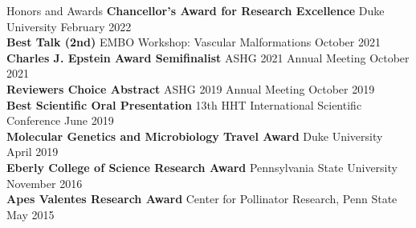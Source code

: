 \documentclass{resume} %
\begin{document}
\begin{rSection}{Honors and Awards}
{\bf Chancellor's Award for Research Excellence} Duke University \hfill {February 2022} \\ 
{\bf Best Talk (2nd)} EMBO Workshop: Vascular Malformations \hfill {October 2021} \\ 
{\bf Charles J. Epstein Award Semifinalist} ASHG 2021 Annual Meeting \hfill {October 2021} \\ 
{\bf Reviewers Choice Abstract} ASHG 2019 Annual Meeting \hfill {October 2019} \\ 
{\bf Best Scientific Oral Presentation} 13th HHT International Scientific Conference \hfill {June 2019} \\ 
{\bf Molecular Genetics and Microbiology Travel Award} Duke University \hfill {April 2019} \\ 
{\bf Eberly College of Science Research Award} Pennsylvania State University \hfill {November 2016} \\ 
{\bf Apes Valentes Research Award} Center for Pollinator Research, Penn State \hfill {May 2015} 
\end{rSection}


%
%
%
\end{document}
